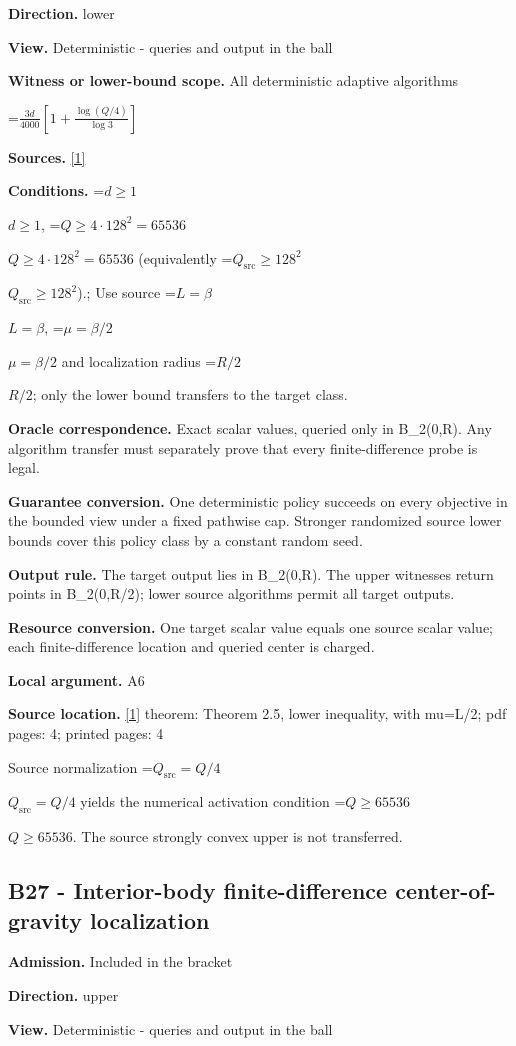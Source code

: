 \documentclass[10pt,a4paper]{article}
\newcommand{\AtlasMath}[1]{\par\begingroup\centering\setbox0=\hbox{$\displaystyle #1$}\ifdim\wd0>1.4\linewidth\typeout{ATLAS WIDE FORMULA: \the\wd0}\fi\ifdim\wd0>\linewidth\resizebox{\linewidth}{!}{\box0}\else\box0\fi\par\endgroup}
\newcommand{\AtlasInlineMath}[1]{\begingroup\setbox0=\hbox{$#1$}\ifdim\wd0>.4\linewidth\endgroup\AtlasMath{#1}\else\endgroup$#1$\fi}
\begin{document}
\textbf{Direction.} lower

\textbf{View.} Deterministic - queries and output in the ball

\textbf{Witness or lower-bound scope.} All deterministic adaptive algorithms

\AtlasMath{\frac{3d}{4000}\left[1+\frac{\log(Q/4)}{\log3}\right]}
\textbf{Sources.} \href{https://arxiv.org/html/2610.00345v1}{[1]}

\textbf{Conditions.} \AtlasInlineMath{d\ge1}, \AtlasInlineMath{Q\ge4\cdot128^2=65536} (equivalently \AtlasInlineMath{Q_{\mathrm{src}}\ge128^2}).; Use source \AtlasInlineMath{L=\beta}, \AtlasInlineMath{\mu=\beta/2} and localization radius \AtlasInlineMath{R/2}; only the lower bound transfers to the target class.

\textbf{Oracle correspondence.} Exact scalar values, queried only in B\_2(0,R). Any algorithm transfer must separately prove that every finite-difference probe is legal.

\textbf{Guarantee conversion.} One deterministic policy succeeds on every objective in the bounded view under a fixed pathwise cap. Stronger randomized source lower bounds cover this policy class by a constant random seed.

\textbf{Output rule.} The target output lies in B\_2(0,R). The upper witnesses return points in B\_2(0,R/2); lower source algorithms permit all target outputs.

\textbf{Resource conversion.} One target scalar value equals one source scalar value; each finite-difference location and queried center is charged.

\textbf{Local argument.} A6

\textbf{Source location.} \href{https://arxiv.org/html/2610.00345v1}{[1]} theorem: Theorem 2.5, lower inequality, with mu=L/2; pdf pages: 4; printed pages: 4

Source normalization \AtlasInlineMath{Q_{\mathrm{src}}=Q/4} yields the numerical activation condition \AtlasInlineMath{Q\ge65536}. The source strongly convex upper is not transferred.

\subsection{B27 - Interior-body finite-difference center-of-gravity localization}
\textbf{Admission.} Included in the bracket

\textbf{Direction.} upper

\textbf{View.} Deterministic - queries and output in the ball
\end{document}
